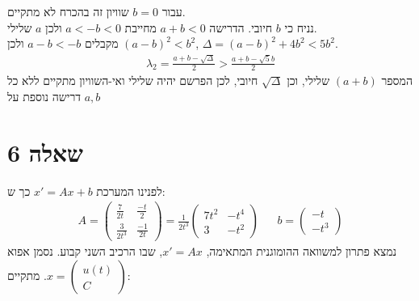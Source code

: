 \documentclass{article}
\begin{document}
עבור $b=0$ שוויון זה בהכרח לא מתקיים.\\
נניח כי $b$ חיובי. הדרישה $a+b<0$ מחייבת $a<-b<0$ ולכן $a$ שלילי. \\
מקבלים $a-b<-b$ ולכן $(a-b)^2<b^2$, $\Delta =(a-b)^2+4b^2<5b^2$.
\begin{align*}
    \lambda_2=\frac{a+b-\sqrt{\Delta}}{2}>\frac{a+b-\sqrt{5}b}{2}
\end{align*}
המספר $(a+b)$ שלילי, וכן $\sqrt{\Delta}$ חיובי, לכן הפרשם יהיה שלילי ואי-השוויון מתקיים ללא כל דרישה נוספת על $a,b$

\pagebreak

\section*{שאלה 6}

לפנינו המערכת $x'=Ax+b$ כך ש:
\begin{align*}
    A=\begin{pmatrix}
          \frac{7}{2t}   & \frac{-t}{2}  \\
          \frac{3}{2t^3} & \frac{-1}{2t}
      \end{pmatrix}=\frac{1}{2t^3}\begin{pmatrix}
                                      7t^2 & -t^4 \\
                                      3    & -t^2
                                  \end{pmatrix} &  & b=\begin{pmatrix}
                                                           -t \\
                                                           -t^3
                                                       \end{pmatrix}
\end{align*}
נמצא פתרון למשוואה ההומוגנית המתאימה, $x'=Ax$, שבו הרכיב השני קבוע. נסמן אפוא $x=\begin{pmatrix}
        u(t) \\
        C
    \end{pmatrix}$. מתקיים:
\end{document}
